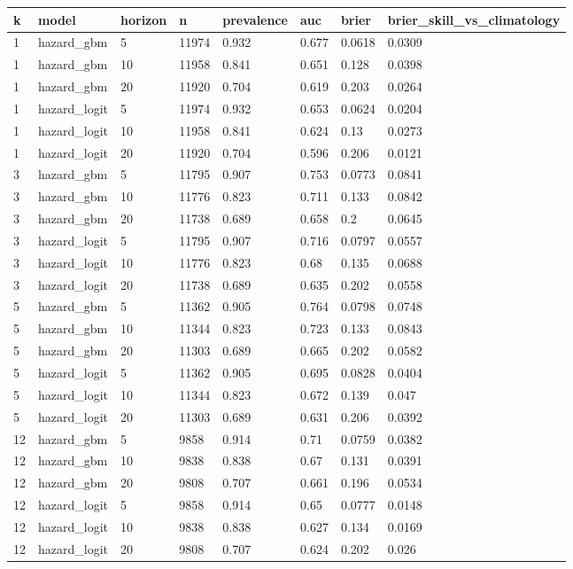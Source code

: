 \begin{tabular}{llllllll}
\toprule
k & model & horizon & n & prevalence & auc & brier & brier\_skill\_vs\_climatology \\
\midrule
1 & hazard\_gbm & 5 & 11974 & 0.932 & 0.677 & 0.0618 & 0.0309 \\
1 & hazard\_gbm & 10 & 11958 & 0.841 & 0.651 & 0.128 & 0.0398 \\
1 & hazard\_gbm & 20 & 11920 & 0.704 & 0.619 & 0.203 & 0.0264 \\
1 & hazard\_logit & 5 & 11974 & 0.932 & 0.653 & 0.0624 & 0.0204 \\
1 & hazard\_logit & 10 & 11958 & 0.841 & 0.624 & 0.13 & 0.0273 \\
1 & hazard\_logit & 20 & 11920 & 0.704 & 0.596 & 0.206 & 0.0121 \\
3 & hazard\_gbm & 5 & 11795 & 0.907 & 0.753 & 0.0773 & 0.0841 \\
3 & hazard\_gbm & 10 & 11776 & 0.823 & 0.711 & 0.133 & 0.0842 \\
3 & hazard\_gbm & 20 & 11738 & 0.689 & 0.658 & 0.2 & 0.0645 \\
3 & hazard\_logit & 5 & 11795 & 0.907 & 0.716 & 0.0797 & 0.0557 \\
3 & hazard\_logit & 10 & 11776 & 0.823 & 0.68 & 0.135 & 0.0688 \\
3 & hazard\_logit & 20 & 11738 & 0.689 & 0.635 & 0.202 & 0.0558 \\
5 & hazard\_gbm & 5 & 11362 & 0.905 & 0.764 & 0.0798 & 0.0748 \\
5 & hazard\_gbm & 10 & 11344 & 0.823 & 0.723 & 0.133 & 0.0843 \\
5 & hazard\_gbm & 20 & 11303 & 0.689 & 0.665 & 0.202 & 0.0582 \\
5 & hazard\_logit & 5 & 11362 & 0.905 & 0.695 & 0.0828 & 0.0404 \\
5 & hazard\_logit & 10 & 11344 & 0.823 & 0.672 & 0.139 & 0.047 \\
5 & hazard\_logit & 20 & 11303 & 0.689 & 0.631 & 0.206 & 0.0392 \\
12 & hazard\_gbm & 5 & 9858 & 0.914 & 0.71 & 0.0759 & 0.0382 \\
12 & hazard\_gbm & 10 & 9838 & 0.838 & 0.67 & 0.131 & 0.0391 \\
12 & hazard\_gbm & 20 & 9808 & 0.707 & 0.661 & 0.196 & 0.0534 \\
12 & hazard\_logit & 5 & 9858 & 0.914 & 0.65 & 0.0777 & 0.0148 \\
12 & hazard\_logit & 10 & 9838 & 0.838 & 0.627 & 0.134 & 0.0169 \\
12 & hazard\_logit & 20 & 9808 & 0.707 & 0.624 & 0.202 & 0.026 \\
\bottomrule
\end{tabular}